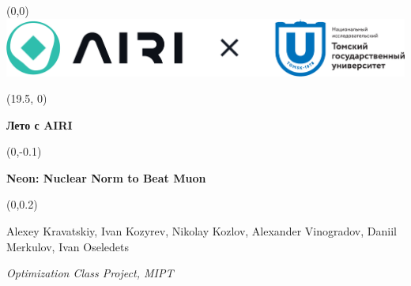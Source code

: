\documentclass[a0]{a0poster}
\begin{document}
%
%


\begin{textblock}{2}(0,0)
\includegraphics[width=4\TPHorizModule]{AIRIxTGU_logos.pdf}
\end{textblock}

\begin{textblock}{5}(19.5, 0)
    \begin{center}
    {\Large \textcolor{bluegray}{\textbf{Лето с AIRI}}}
    \end{center}
    \end{textblock}

\begin{textblock}{23}(0,-0.1)
    \begin{center}
    {\fontsize{96}{110}\selectfont\color{Red} \textbf{Neon: Nuclear Norm to Beat Muon}}
    \end{center}
    \end{textblock}

\begin{textblock}{23}(0,0.2)
    \begin{center}
    {\large Alexey Kravatskiy, Ivan Kozyrev, Nikolay Kozlov, Alexander Vinogradov, Daniil Merkulov, Ivan Oseledets}
    
    \vspace{0.5em}
    
    {\normalsize \color{bluegray} \emph{Optimization Class Project, MIPT}}
    \end{center}
    \end{textblock}
\end{document}
